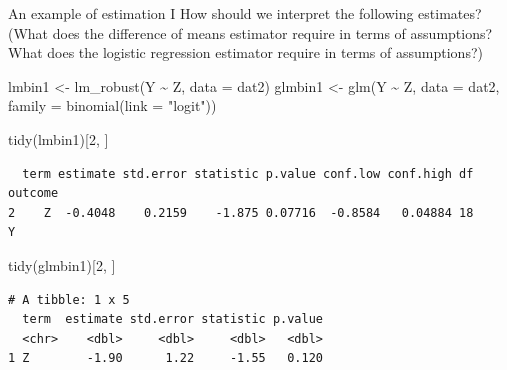 \documentclass[
  ignorenonframetext,
]{beamer}
\newenvironment{Shaded}{\begin{snugshade}}{\end{snugshade}}
\newcommand{\AttributeTok}[1]{\textcolor[rgb]{0.77,0.63,0.00}{#1}}
\newcommand{\DecValTok}[1]{\textcolor[rgb]{0.00,0.00,0.81}{#1}}
\newcommand{\FunctionTok}[1]{\textcolor[rgb]{0.00,0.00,0.00}{#1}}
\newcommand{\NormalTok}[1]{#1}
\newcommand{\OtherTok}[1]{\textcolor[rgb]{0.56,0.35,0.01}{#1}}
\newcommand{\SpecialCharTok}[1]{\textcolor[rgb]{0.00,0.00,0.00}{#1}}
\newcommand{\StringTok}[1]{\textcolor[rgb]{0.31,0.60,0.02}{#1}}
\begin{document}
\begin{frame}[fragile]{An example of estimation I}
\protect\hypertarget{an-example-of-estimation-i}{}
How should we interpret the following estimates? (What does the
difference of means estimator require in terms of assumptions? What does
the logistic regression estimator require in terms of assumptions?)

\scriptsize

\begin{Shaded}
\begin{Highlighting}[]
\NormalTok{lmbin1 }\OtherTok{\textless{}{-}} \FunctionTok{lm\_robust}\NormalTok{(Y }\SpecialCharTok{\textasciitilde{}}\NormalTok{ Z, }\AttributeTok{data =}\NormalTok{ dat2)}
\NormalTok{glmbin1 }\OtherTok{\textless{}{-}} \FunctionTok{glm}\NormalTok{(Y }\SpecialCharTok{\textasciitilde{}}\NormalTok{ Z, }\AttributeTok{data =}\NormalTok{ dat2, }\AttributeTok{family =} \FunctionTok{binomial}\NormalTok{(}\AttributeTok{link =} \StringTok{"logit"}\NormalTok{))}

\FunctionTok{tidy}\NormalTok{(lmbin1)[}\DecValTok{2}\NormalTok{, ]}
\end{Highlighting}
\end{Shaded}

\begin{verbatim}
  term estimate std.error statistic p.value conf.low conf.high df outcome
2    Z  -0.4048    0.2159    -1.875 0.07716  -0.8584   0.04884 18       Y
\end{verbatim}

\begin{Shaded}
\begin{Highlighting}[]
\FunctionTok{tidy}\NormalTok{(glmbin1)[}\DecValTok{2}\NormalTok{, ]}
\end{Highlighting}
\end{Shaded}

\begin{verbatim}
# A tibble: 1 x 5
  term  estimate std.error statistic p.value
  <chr>    <dbl>     <dbl>     <dbl>   <dbl>
1 Z        -1.90      1.22     -1.55   0.120
\end{verbatim}

\normalsize
\end{frame}
\end{document}

